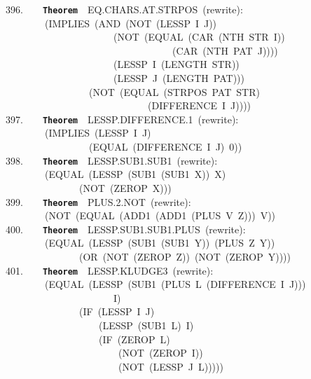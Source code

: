 \documentclass[11pt]{book}
\newenvironment{pubasis}{\begin{flushleft}\ttfamily\small}{\normalsize\rmfamily\end{flushleft}}
\newcommand{\axiomordefinition}[1]{\vspace{6pt}\texttt{\textbf{#1}}}
\begin{document}
\begin{pubasis}
396.~~~~\axiomordefinition{Theorem}~~EQ.CHARS.AT.STRPOS~(rewrite):\\
~~~~~~~~(IMPLIES~(AND~(NOT~(LESSP~I~J))\\
~~~~~~~~~~~~~~~~~~~~~~(NOT~(EQUAL~(CAR~(NTH~STR~I))\\
~~~~~~~~~~~~~~~~~~~~~~~~~~~~~~~~~~(CAR~(NTH~PAT~J))))\\
~~~~~~~~~~~~~~~~~~~~~~(LESSP~I~(LENGTH~STR))\\
~~~~~~~~~~~~~~~~~~~~~~(LESSP~J~(LENGTH~PAT)))\\
~~~~~~~~~~~~~~~~~(NOT~(EQUAL~(STRPOS~PAT~STR)\\
~~~~~~~~~~~~~~~~~~~~~~~~~~~~~(DIFFERENCE~I~J))))\\

397.~~~~\axiomordefinition{Theorem}~~LESSP.DIF\-FER\-ENCE.1~(rewrite):\\
~~~~~~~~(IMPLIES~(LESSP~I~J)\\
~~~~~~~~~~~~~~~~~(EQUAL~(DIFFERENCE~I~J)~0))\\

398.~~~~\axiomordefinition{Theorem}~~LESSP.SUB1.SUB1~(rewrite):\\
~~~~~~~~(EQUAL~(LESSP~(SUB1~(SUB1~X))~X)\\
~~~~~~~~~~~~~~~(NOT~(ZEROP~X)))\\

399.~~~~\axiomordefinition{Theorem}~~PLUS.2.NOT~(rewrite):\\
~~~~~~~~(NOT~(EQUAL~(ADD1~(ADD1~(PLUS~V~Z)))~V))\\

400.~~~~\axiomordefinition{Theorem}~~LESSP.SUB1.SUB1.PLUS~(rewrite):\\
~~~~~~~~(EQUAL~(LESSP~(SUB1~(SUB1~Y))~(PLUS~Z~Y))\\
~~~~~~~~~~~~~~~(OR~(NOT~(ZEROP~Z))~(NOT~(ZEROP~Y))))\\

401.~~~~\axiomordefinition{Theorem}~~LESSP.KLUDGE3~(rewrite):\\
~~~~~~~~(EQUAL~(LESSP~(SUB1~(PLUS~L~(DIFFERENCE~I~J)))\\
~~~~~~~~~~~~~~~~~~~~~~I)\\
~~~~~~~~~~~~~~~(IF~(LESSP~I~J)\\
~~~~~~~~~~~~~~~~~~~(LESSP~(SUB1~L)~I)\\
~~~~~~~~~~~~~~~~~~~(IF~(ZEROP~L)\\
~~~~~~~~~~~~~~~~~~~~~~~(NOT~(ZEROP~I))\\
~~~~~~~~~~~~~~~~~~~~~~~(NOT~(LESSP~J~L)))))\\


\end{pubasis}
\end{document}
